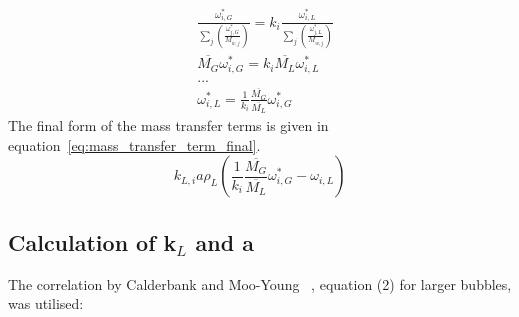\documentclass{article}
\begin{document}
\begin{equation}
	\begin{split}
		&\frac{\omega_{i,G}^*}{\sum_j \left( \frac{\omega_{j,G}^*}{M_{w,j}}\right)} = k_i\frac{\omega_{i,L}^*}{\sum_j \left( \frac{\omega_{j,L}^*}{M_{w,j}}\right)} \\
		&\overline{M_G}\omega_{i,G}^* = k_i \overline{M_L}\omega_{i,L}^*\\
		&...\\
		&\omega_{i,L}^* = \frac{1}{k_i}\frac{\overline{M_G}}{\overline{M_L}}\omega_{i,G}^* 
	\label{eq:GL_equilibrium_criterium_average_molar_mass_inserted}
	\end{split}
\end{equation}
The final form of the mass transfer terms is given in equation~\ref{eq:mass_transfer_term_final}.
\begin{equation}
	k_{L,i}a\rho_L(\frac{1}{k_i}\frac{\overline{M_G}}{\overline{M_L}}\omega_{i,G}^*-\omega_{i,L})
	\label{eq:mass_transfer_term_final}
\end{equation}

\subsection{Calculation of k$_L$ and a}
The correlation by Calderbank and Moo-Young ~\cite{CalderbankMoo-Young1961}, equation (2) for larger bubbles, was utilised:
\end{document}

